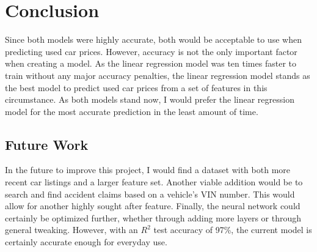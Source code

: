 \documentclass[compsoc]{IEEEtran}
\begin{document}
\section{Conclusion} 
Since both models were highly accurate, both would be acceptable to use when predicting used car prices. However, accuracy is not the only important factor when creating a model. As the linear regression model was ten times faster to train without any major accuracy penalties, the linear regression model stands as the best model to predict used car prices from a set of features in this circumstance. As both models stand now, I would prefer the linear regression model for the most accurate prediction in the least amount of time.
\subsection{Future Work}
In the future to improve this project, I would find a dataset with both more recent car listings and a larger feature set. Another viable addition would be to search and find accident claims based on a vehicle's VIN number. This would allow for another highly sought after feature. Finally, the neural network could certainly be optimized further, whether through adding more layers or through general tweaking. However, with an $R^2$ test accuracy of 97\%, the current model is certainly accurate enough for everyday use.


\end{document}
